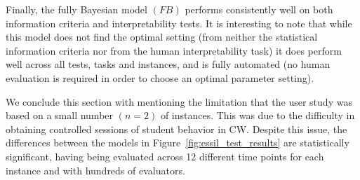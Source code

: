 \documentclass[letterpaper]{article} %
\begin{document}

Finally, the fully Bayesian model $(FB)$ performs consistently well on both information criteria and interpretability tests. It is interesting to note that while this model does not find the optimal setting (from neither the statistical information criteria nor from the human interpretability task) it does perform well across all tests, tasks and instances, and is fully automated (no human evaluation is required in order to choose an optimal parameter setting).

We conclude this section with mentioning the limitation that the user study was based on a small number $(n=2)$  of instances. This was due to the difficulty in obtaining controlled sessions of student behavior in CW. Despite this issue, the differences between the models in Figure~\ref{fig:essil_test_results} are statistically significant, having being evaluated across 12 different time points for each instance and with hundreds of evaluators.

\end{document}
